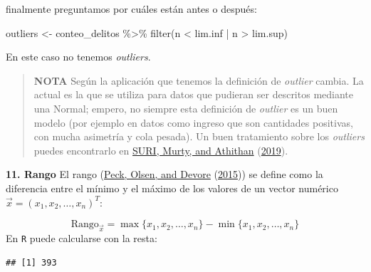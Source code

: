 \documentclass[
]{book}
\newenvironment{Shaded}{\begin{snugshade}}{\end{snugshade}}
\newcommand{\CommentTok}[1]{\textcolor[rgb]{0.56,0.35,0.01}{\textit{#1}}}
\newcommand{\FunctionTok}[1]{\textcolor[rgb]{0.00,0.00,0.00}{#1}}
\newcommand{\NormalTok}[1]{#1}
\newcommand{\OtherTok}[1]{\textcolor[rgb]{0.56,0.35,0.01}{#1}}
\newcommand{\SpecialCharTok}[1]{\textcolor[rgb]{0.00,0.00,0.00}{#1}}
\begin{document}
finalmente preguntamos por cuáles están antes o después:

\begin{Shaded}
\begin{Highlighting}[]
\NormalTok{outliers }\OtherTok{\textless{}{-}}\NormalTok{ conteo\_delitos }\SpecialCharTok{\%\textgreater{}\%} \FunctionTok{filter}\NormalTok{(n }\SpecialCharTok{\textless{}}\NormalTok{ lim.inf }\SpecialCharTok{|}\NormalTok{ n }\SpecialCharTok{\textgreater{}}\NormalTok{ lim.sup)}
\end{Highlighting}
\end{Shaded}

En este caso no tenemos \emph{outliers}.

\begin{quote}
\textbf{NOTA} Según la aplicación que tenemos la definición de \emph{outlier} cambia. La actual es la que se utiliza para datos que pudieran ser descritos mediante una Normal; empero, no siempre esta definición de \emph{outlier} es un buen modelo (por ejemplo en datos como ingreso que son cantidades positivas, con mucha asimetría y cola pesada). Un buen tratamiento sobre los \emph{outliers} puedes encontrarlo en \protect\hyperlink{ref-suri2019outlier}{SURI, Murty, and Athithan} (\protect\hyperlink{ref-suri2019outlier}{2019}).
\end{quote}

\textbf{11. Rango} El rango (\protect\hyperlink{ref-peck2015introduction}{Peck, Olsen, and Devore} (\protect\hyperlink{ref-peck2015introduction}{2015})) se define como la diferencia entre el mínimo y el máximo de los valores de un vector numérico \(\vec{x} = (x_1, x_2, \dots, x_n)^T\):

\[
\textrm{Rango}_{\vec{x}} = \max \{x_1, x_2, \dots, x_n\} - \min \{x_1, x_2, \dots, x_n\}
\]
En \texttt{R} puede calcularse con la resta:

\begin{Shaded}
\end{Shaded}

\begin{verbatim}
## [1] 393
\end{verbatim}
\end{document}
